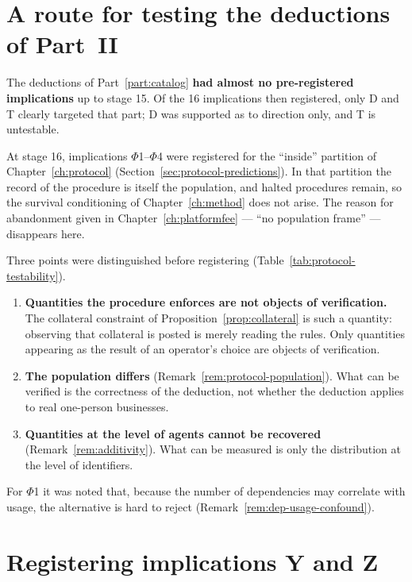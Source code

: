 \section{A route for testing the deductions of Part~II}

The deductions of Part~\ref{part:catalog} \textbf{had almost no pre-registered implications} up to
stage 15. Of the 16 implications then registered, only D and T clearly targeted that part; D was
supported as to direction only, and T is untestable.

At stage 16, implications $\Phi$1--$\Phi$4 were registered for the ``inside'' partition of
Chapter~\ref{ch:protocol} (Section~\ref{sec:protocol-predictions}). In that partition the record of
the procedure is itself the population, and halted procedures remain, so the survival conditioning
of Chapter~\ref{ch:method} does not arise. The reason for abandonment given in
Chapter~\ref{ch:platformfee} — ``no population frame'' — disappears here.

Three points were distinguished before registering (Table~\ref{tab:protocol-testability}).

\begin{enumerate}[label=(\arabic*)]
\item \textbf{Quantities the procedure enforces are not objects of verification.} The collateral
constraint of Proposition~\ref{prop:collateral} is such a quantity: observing that collateral is
posted is merely reading the rules. Only quantities appearing as the result of an operator's choice
are objects of verification.

\item \textbf{The population differs} (Remark~\ref{rem:protocol-population}). What can be verified
is the correctness of the deduction, not whether the deduction applies to real one-person
businesses.

\item \textbf{Quantities at the level of agents cannot be recovered}
(Remark~\ref{rem:additivity}). What can be measured is only the distribution at the level of
identifiers.
\end{enumerate}

For $\Phi$1 it was noted that, because the number of dependencies may correlate with usage, the
alternative is hard to reject (Remark~\ref{rem:dep-usage-confound}).

\section{Registering implications Y and Z}

